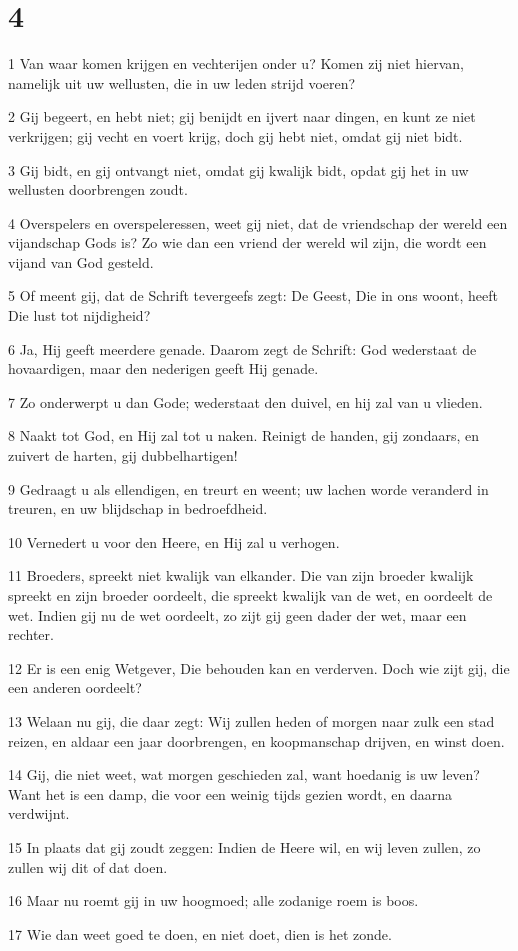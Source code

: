 \chapter{4}

\par 1 Van waar komen krijgen en vechterijen onder u? Komen zij niet hiervan, namelijk uit uw wellusten, die in uw leden strijd voeren?
\par 2 Gij begeert, en hebt niet; gij benijdt en ijvert naar dingen, en kunt ze niet verkrijgen; gij vecht en voert krijg, doch gij hebt niet, omdat gij niet bidt.
\par 3 Gij bidt, en gij ontvangt niet, omdat gij kwalijk bidt, opdat gij het in uw wellusten doorbrengen zoudt.
\par 4 Overspelers en overspeleressen, weet gij niet, dat de vriendschap der wereld een vijandschap Gods is? Zo wie dan een vriend der wereld wil zijn, die wordt een vijand van God gesteld.
\par 5 Of meent gij, dat de Schrift tevergeefs zegt: De Geest, Die in ons woont, heeft Die lust tot nijdigheid?
\par 6 Ja, Hij geeft meerdere genade. Daarom zegt de Schrift: God wederstaat de hovaardigen, maar den nederigen geeft Hij genade.
\par 7 Zo onderwerpt u dan Gode; wederstaat den duivel, en hij zal van u vlieden.
\par 8 Naakt tot God, en Hij zal tot u naken. Reinigt de handen, gij zondaars, en zuivert de harten, gij dubbelhartigen!
\par 9 Gedraagt u als ellendigen, en treurt en weent; uw lachen worde veranderd in treuren, en uw blijdschap in bedroefdheid.
\par 10 Vernedert u voor den Heere, en Hij zal u verhogen.
\par 11 Broeders, spreekt niet kwalijk van elkander. Die van zijn broeder kwalijk spreekt en zijn broeder oordeelt, die spreekt kwalijk van de wet, en oordeelt de wet. Indien gij nu de wet oordeelt, zo zijt gij geen dader der wet, maar een rechter.
\par 12 Er is een enig Wetgever, Die behouden kan en verderven. Doch wie zijt gij, die een anderen oordeelt?
\par 13 Welaan nu gij, die daar zegt: Wij zullen heden of morgen naar zulk een stad reizen, en aldaar een jaar doorbrengen, en koopmanschap drijven, en winst doen.
\par 14 Gij, die niet weet, wat morgen geschieden zal, want hoedanig is uw leven? Want het is een damp, die voor een weinig tijds gezien wordt, en daarna verdwijnt.
\par 15 In plaats dat gij zoudt zeggen: Indien de Heere wil, en wij leven zullen, zo zullen wij dit of dat doen.
\par 16 Maar nu roemt gij in uw hoogmoed; alle zodanige roem is boos.
\par 17 Wie dan weet goed te doen, en niet doet, dien is het zonde.

